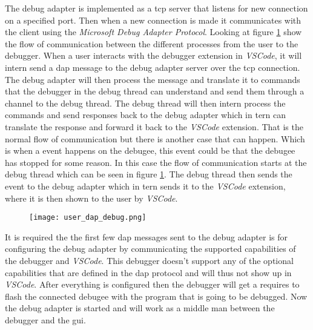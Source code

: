 
The debug adapter is implemented as a \gls{tcp} server that listens for new connection on a specified port.
Then when a new connection is made it communicates with the client using the \emph{Microsoft Debug Adapter Protocol}.
Looking at figure \ref{fig:userDAP} show the flow of communication between the different processes from the user to the debugger.
When a user interacts with the debugger extension in \emph{VSCode}, it will intern send a \acrshort{dap} message to the debug adapter server over the \gls{tcp} connection.
The debug adapter will then process the message and translate it to commands that the debugger in the debug thread can understand and send them through a channel to the debug thread.
The debug thread will then intern process the commands and send responses back to the debug adapter which in tern can translate the response and forward it back to the \emph{VSCode} extension.
That is the normal flow of communication but there is another case that can happen.
Which is when a event happens on the debugee, this event could be that the debugee has stopped for some reason.
In this case the flow of communication starts at the debug thread which can be seen in figure \ref{fig:userDAP}.
The debug thread then sends the event to the debug adapter which in tern sends it to the \emph{VSCode} extension, where it is then shown to the user by \emph{VSCode}.


\begin{figure}[h]
    \centering
    \texttt{[image: user\_dap\_debug.png]}
    \label{fig:userDAP}
\end{figure}


It is required the the first few \acrshort{dap} messages sent to the debug adapter is for configuring the debug adapter by communicating the supported capabilities of the debugger and \emph{VSCode}.
This debugger doesn't support any of the optional capabilities that are defined in the \acrshort{dap} protocol and will thus not show up in \emph{VSCode}.
After everything is configured then the debugger will get a requires to flash the connected debugee with the program that is going to be debugged.
Now the debug adapter is started and will work as a middle man between the debugger and the \acrshort{gui}.


